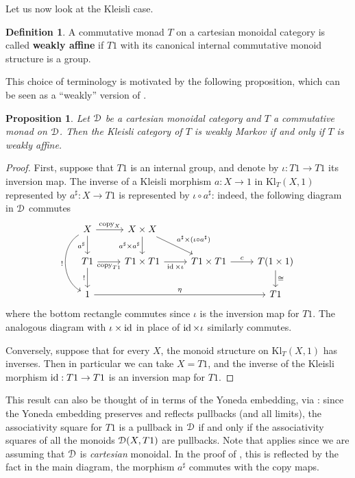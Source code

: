 \documentclass[a4paper,UKenglish,numberwithinsect,cleveref, autoref, thm-restate]{lipics-v2021}
\theoremstyle{plain} %
\newtheorem{myproposition}[mytheorem]{Proposition}
\theoremstyle{definition} %
\newtheorem{mydefinition}[mytheorem]{Definition}
\begin{document}
Let us now look at the Kleisli case.

\begin{mydefinition}\label{defweaklyaffine}
 A commutative monad $T$ on a cartesian monoidal category is called \textbf{weakly affine} if $T1$ with its canonical internal commutative monoid structure is a group.
\end{mydefinition}

This choice of terminology is motivated by the following proposition, which can be seen as a ``weakly'' version of .

\begin{myproposition}\label{weaklyboth}
 Let $\mathcal{D}$ be a cartesian monoidal category and $T$ a commutative monad on $\mathcal{D}$. Then the Kleisli category of $T$ is weakly Markov if and only if $T$ is weakly affine.
\end{myproposition}
\begin{proof}
 First, suppose that $T1$ is an internal group, and denote by $\iota:T1\to T1$ its inversion map. 
 The inverse of a Kleisli morphism $a : X \to 1$ in $\mathrm{Kl}_T(X,1)$ represented by $a^\sharp:X\to T1$ is represented by $\iota\circ a^\sharp$: indeed, the following diagram in $\mathcal{D}$ commutes
 \[
  \begin{tikzcd}
  X \ar[bend right=5pc]{dd}[swap]{!} \ar{d}[swap]{a^\sharp} \ar{r}{\mathrm{copy}_X} & X\times X \ar{d}[swap]{a^\sharp\times a^\sharp} \ar{dr}{a^\sharp\times(\iota\circ a^\sharp)} \\
  T1 \ar{d}[swap]{!} \ar{r}[swap]{\mathrm{copy}_{T1}} & T1\times T1 \ar{r}[swap]{\id\times\iota} & T1\times T1 \ar{r}{c} & T(1\times 1) \ar{d}{\cong} \\
  1 \ar{rrr}{\eta} &&& T1
  \end{tikzcd}
 \]
 where the bottom rectangle commutes since $\iota$ is the inversion map for $T1$. The analogous diagram with $\iota\times\operatorname{ id}$ in place of $\operatorname{ id}\times\iota$ 
 similarly commutes.
 
 Conversely, suppose that for every $X$, the monoid structure on $\mathrm{Kl}_T(X,1)$ has inverses. Then in particular we can take $X=T1$, and the inverse of the Kleisli morphism $\operatorname{ id}:T1\to T1$ is an inversion map for $T1$. 
\end{proof}

This result can also be thought of in terms of the Yoneda embedding, via : since the Yoneda embedding preserves and reflects pullbacks (and all limits), the associativity square for $T1$ is a pullback in $\mathcal{D}$ if and only if the associativity squares of all the monoids $\mathcal{D}(X,T1)$ are pullbacks.
Note that  applies since we are assuming that $\mathcal{D}$ is \emph{cartesian} monoidal. In the proof of , this is reflected by the fact in the main diagram, the morphism $a^\sharp$ commutes with the copy maps. 
\end{document}
